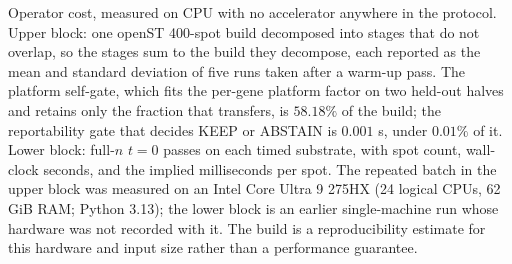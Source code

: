 Operator cost, measured on CPU with no accelerator anywhere in the protocol. Upper block: one openST 400-spot build decomposed into stages that do not overlap, so the stages sum to the build they decompose, each reported as the mean and standard deviation of five runs taken after a warm-up pass. The platform self-gate, which fits the per-gene platform factor on two held-out halves and retains only the fraction that transfers, is \(58.18\%\) of the build; the reportability gate that decides KEEP or ABSTAIN is \(0.001\) s, under \(0.01\%\) of it. Lower block: full-\(n\) \(t=0\) passes on each timed substrate, with spot count, wall-clock seconds, and the implied milliseconds per spot. The repeated batch in the upper block was measured on an Intel Core Ultra 9 275HX (24 logical CPUs, 62\,GiB RAM; Python 3.13); the lower block is an earlier single-machine run whose hardware was not recorded with it. The build is a reproducibility estimate for this hardware and input size rather than a performance guarantee.
